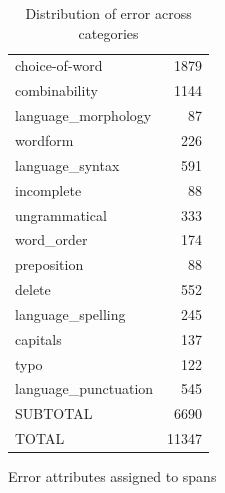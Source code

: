 \begin{multicols}{2}
\begin{table}[H]
\begin{tabular}{lr}
		\hspace{3em}choice-of-word        & 1879  \\
		\hspace{3em}combinability         & 1144  \\
		\hspace{1em}language\_morphology  & 87    \\
		\hspace{3em}wordform       & 226   \\
		\hspace{1em}language\_syntax      & 591   \\
		\hspace{3em}incomplete & 88    \\
		\hspace{3em}ungrammatical         & 333   \\
		\hspace{3em}word\_order           & 174   \\
		\hspace{3em}preposition           & 88    \\
		\hspace{3em}delete                & 552   \\
		\hspace{1em}language\_spelling    & 245   \\
		\hspace{3em}capitals              & 137   \\
		\hspace{3em}typo                  & 122   \\
		\hspace{1em}language\_punctuation & 545   \\
		SUBTOTAL						  & 6690  \\
		\midrule
		TOTAL                 & 11347 \\
		\bottomrule
	\end{tabular}
\caption{\label{tab:errstats}Distribution of error across categories}
\end{table}

\columnbreak

\vspace*{10em}
\noindent Error attributes assigned to spans


\end{multicols}
